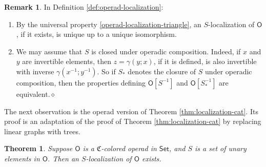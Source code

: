 \documentclass[11pt]{amsbook}
\numberwithin{section}{chapter}
\numberwithin{subsection}{section}
\numberwithin{equation}{section}
\theoremstyle{plain}
\newtheorem{theorem}[equation]{Theorem}
\theoremstyle{definition}
\newtheorem{remark}[equation]{Remark}
\newcommand{\colorc}{\mathfrak{C}}
\renewcommand{\O}{\mathsf{O}}
\newcommand{\dqed}{\hfill$\diamond$}
\newcommand{\inv}[1]{{#1}^{-1}}
\newcommand{\Sinv}{\inv{S}}
\newcommand{\xinv}{\inv{x}}
\newcommand{\yinv}{\inv{y}}
\newcommand{\Osinv}{\O[\Sinv]}
\newcommand{\Set}{\mathsf{Set}}
\begin{document}
\begin{remark} In Definition \ref{def:operad-localization}:
\begin{enumerate}\item By the universal property \eqref{operad-localization-triangle}, an $S$-localization of $\O$, if it exists, is unique up to a unique isomorphism.  
\item We may assume that $S$ is closed under operadic composition.  Indeed, if $x$ and $y$ are invertible elements, then $z=\gamma(y;x)$, if it is defined, is also invertible with inverse $\gamma(\xinv;\yinv)$.  So if $S_*$ denotes the closure of $S$ under operadic composition, then the properties defining $\Osinv$ and $\O[\Sinv_*]$ are equivalent.\dqed
\end{enumerate}\end{remark}

The next observation is the operad version of Theorem \ref{thm:localization-cat}.  Its proof  is an adaptation of the proof of Theorem \ref{thm:localization-cat} by replacing linear graphs with trees.

\begin{theorem}\label{thm:operad-localization-exists}
Suppose $\O$ is a $\colorc$-colored operad in $\Set$, and $S$ is a set of unary elements in $\O$.  Then an $S$-localization of $\O$ exists.
\end{theorem}
\end{document}
